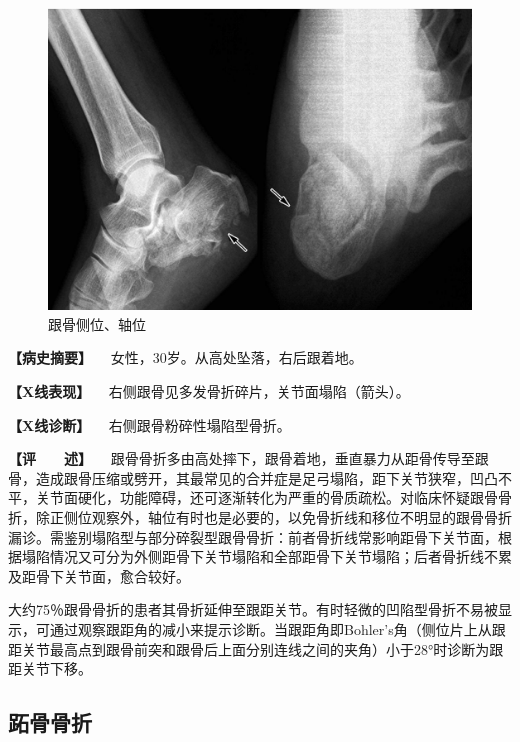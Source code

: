 \begin{figure}[!htbp]
 \centering
 \includegraphics{./images/Image00057.jpg}
 \captionsetup{justification=centering}
 \caption{跟骨侧位、轴位}
 \label{fig2-3-30}
  \end{figure} 

\textbf{【病史摘要】} 　女性，30岁。从高处坠落，右后跟着地。

\textbf{【X线表现】} 　右侧跟骨见多发骨折碎片，关节面塌陷（箭头）。

\textbf{【X线诊断】} 　右侧跟骨粉碎性塌陷型骨折。

\textbf{【评　　述】}
　跟骨骨折多由高处摔下，跟骨着地，垂直暴力从距骨传导至跟骨，造成跟骨压缩或劈开，其最常见的合并症是足弓塌陷，距下关节狭窄，凹凸不平，关节面硬化，功能障碍，还可逐渐转化为严重的骨质疏松。对临床怀疑跟骨骨折，除正侧位观察外，轴位有时也是必要的，以免骨折线和移位不明显的跟骨骨折漏诊。需鉴别塌陷型与部分碎裂型跟骨骨折：前者骨折线常影响距骨下关节面，根据塌陷情况又可分为外侧距骨下关节塌陷和全部距骨下关节塌陷；后者骨折线不累及距骨下关节面，愈合较好。

大约75％跟骨骨折的患者其骨折延伸至跟距关节。有时轻微的凹陷型骨折不易被显示，可通过观察跟距角的减小来提示诊断。当跟距角即Bohler's角（侧位片上从跟距关节最高点到跟骨前突和跟骨后上面分别连线之间的夹角）小于28°时诊断为跟距关节下移。

\subsection{跖骨骨折}

